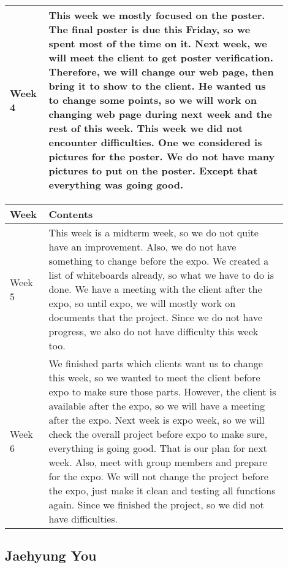 \documentclass[10pt]{article}
\begin{document}
\begin{center}
\begin{tabular}{ | p{0.1\linewidth} | p{0.8\linewidth} | }
                Week 4 & This week we mostly focused on the poster. The final poster is due this Friday, so we spent most of the time on it. Next week, we will meet the client to get poster verification. Therefore, we will change our web page, then bring it to show to the client. He wanted us to change some points, so we will work on changing web page during next week and the rest of this week. This week we did not encounter difficulties. One we considered is pictures for the poster. We do not have many pictures to put on the poster. Except that everything was going good.  \\ \hline
            \end{tabular}

            \begin{tabular}{ | p{0.1\linewidth} | p{0.8\linewidth} | } \hline
                Week & Contents  \\ \hline
                Week 5 & This week is a midterm week, so we do not quite have an improvement. Also, we do not have something to change before the expo. We created a list of whiteboards already, so what we have to do is done. We have a meeting with the client after the expo, so until expo, we will mostly work on documents that the project.  Since we do not have progress, we also do not have difficulty this week too.   \\ \hline
                Week 6 &  We finished parts which clients want us to change this week, so we wanted to meet the client before expo to make sure those parts. However, the client is available after the expo, so we will have a meeting after the expo. Next week is expo week, so we will check the overall project before expo to make sure, everything is going good. That is our plan for next week. Also, meet with group members and prepare for the expo. We will not change the project before the expo, just make it clean and testing all functions again. Since we finished the project, so we did not have difficulties.   \\ \hline
            \end{tabular}
            \end{center}

    \subsection{Jaehyung You}
\end{document}
